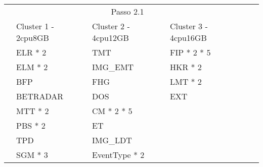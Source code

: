 \begin{table}[H]
  \centering
  \small
  \setlength{\extrarowheight}{3pt}
  \setlength{\arrayrulewidth}{1pt}
  
  \begin{tabular}{|l|l|l|l|l|l|}
    \hline
    \cellcolor{white} & \multicolumn{3}{|c|}{\cellcolor[HTML]{FBE6A3}Passo 2.1} & \cellcolor{white}             & \cellcolor{white}  \\ \cline{2-5} 
                                     & \cellcolor[HTML]{4EAC5B}Cluster 1 - 2cpu8GB & \cellcolor[HTML]{4EAC5B}Cluster 2 - 4cpu12GB & \cellcolor[HTML]{4EAC5B}Cluster 3 - 4cpu16GB &                              & \\ \cline{1-5}
                                     & \cellcolor[HTML]{A9D08E}ELR * 2             & \cellcolor[HTML]{BDD7EE}TMT                & \cellcolor[HTML]{A9D08E}FIP * 2 * 5       &                              & \\ \cline{1-5}
                                     & \cellcolor[HTML]{A9D08E}ELM * 2             & \cellcolor[HTML]{BDD7EE}IMG\_EMT           & \cellcolor[HTML]{A9D08E}HKR * 2           &                              & \\ \cline{1-5}
                                     & \cellcolor[HTML]{A9D08E}BFP                 & \cellcolor[HTML]{BDD7EE}FHG                & \cellcolor[HTML]{BDD7EE}LMT * 2           &                              & \\ \cline{1-5}
                                     & \cellcolor[HTML]{A9D08E}BETRADAR            & \cellcolor[HTML]{BDD7EE}DOS                & \cellcolor[HTML]{BDD7EE}EXT               &                              & \\ \cline{1-5}
                                     & \cellcolor[HTML]{BDD7EE}MTT * 2             & \cellcolor[HTML]{BDD7EE}CM * 2 * 5         &                                           &                              & \\ \cline{1-5}
                                     & \cellcolor[HTML]{BDD7EE}PBS * 2             & \cellcolor[HTML]{BDD7EE}ET                 &                                           &                              & \\ \cline{1-5}
                                     & \cellcolor[HTML]{BDD7EE}TPD                 & \cellcolor[HTML]{BDD7EE}IMG\_LDT           &                                           &                              & \\ \cline{1-5}
                                     & \cellcolor[HTML]{BDD7EE}SGM * 3             & \cellcolor[HTML]{A9D08E}EventType * 2      &            &                              & \\  \cline{1-5}

\end{tabular}
\end{table}
